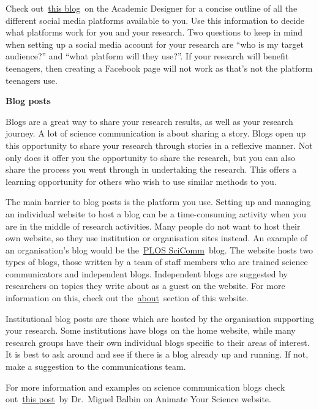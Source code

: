 \documentclass[
]{book}
\begin{document}
Check out~\href{https://theacademicdesigner.com/2019/social-media-platforms/}{this blog}~on the Academic Designer for a concise outline of all the different social media platforms available to you. Use this information to decide what platforms work for you and your research. Two questions to keep in mind when setting up a social media account for your research are ``who is my target audience?'' and ``what platform will they use?''. If your research will benefit teenagers, then creating a Facebook page will not work as that's not the platform teenagers use.~

\textbf{Blog posts}

Blogs are a great way to share your research results, as well as your research journey. A lot of science communication is about sharing a story. Blogs open up this opportunity to share your research through stories in a reflexive manner. Not only does it offer you the opportunity to share the research, but you can also share the process you went through in undertaking the research. This offers a learning opportunity for others who wish to use similar methods to you.

The main barrier to blog posts is the platform you use. Setting up and managing an individual website to host a blog can be a time-consuming activity when you are in the middle of research activities. Many people do not want to host their own website, so they use institution or organisation sites instead. An example of an organisation's blog would be the~\href{https://scicomm.plos.org/}{PLOS SciComm}~blog. The website hosts two types of blogs, those written by a team of staff members who are trained science communicators and independent blogs. Independent blogs are suggested by researchers on topics they write about as a guest on the website. For more information on this, check out the~\href{https://plos.org/blogs/about/}{about}~section of this website.

Institutional blog posts are those which are hosted by the organisation supporting your research. Some institutions have blogs on the home website, while many research groups have their own individual blogs specific to their areas of interest. It is best to ask around and see if there is a blog already up and running. If not, make a suggestion to the communications team.

For more information and examples on science communication blogs check out~\href{https://www.animateyour.science/post/top-5-science-communication-blogs}{this post}~by Dr.~Miguel Balbin on Animate Your Science website.
\end{document}
